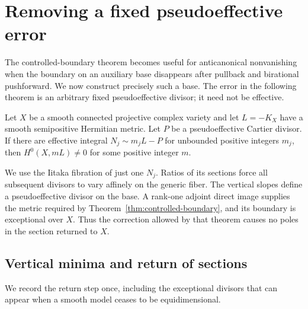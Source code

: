 \section{Removing a fixed pseudoeffective error}
\label{conv:section}

The controlled-boundary theorem becomes useful for anticanonical
nonvanishing when the boundary on an auxiliary base disappears after
pullback and birational pushforward.  We now construct precisely such a
base.  The error in the following theorem is an arbitrary fixed
pseudoeffective divisor; it need not be effective.

\begin{theorem}\label{conv:fixed-error}
Let $X$ be a smooth connected projective complex variety and let
$L=-K_X$ have a smooth semipositive Hermitian metric.  Let $P$ be a
pseudoeffective Cartier divisor.  If there are effective integral
$N_j\sim m_jL-P$ for unbounded positive integers $m_j$, then
$H^0(X,mL)\ne0$ for some positive integer $m$.
\end{theorem}

We use the Iitaka fibration of just one $N_j$.  Ratios of its sections
force all subsequent divisors to vary affinely on the generic fiber.
The vertical slopes define a pseudoeffective divisor on the base.  A
rank-one adjoint direct image supplies the metric required by
Theorem~\ref{thm:controlled-boundary}, and its boundary is exceptional
over $X$.  Thus the correction allowed by that theorem causes no poles
in the section returned to $X$.

\subsection{Vertical minima and return of sections}

We record the return step once, including the exceptional divisors that
can appear when a smooth model ceases to be equidimensional.

